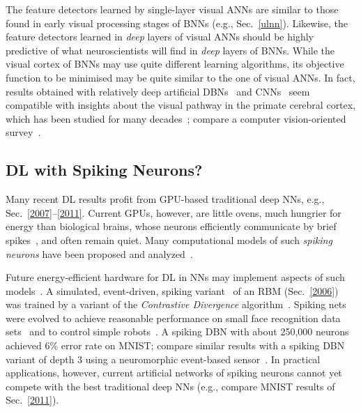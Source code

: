 \documentclass[letterpaper]{article}
\begin{document}
\begin{sloppypar}
The feature detectors learned by single-layer visual ANNs 
are similar to those found in early visual processing stages of BNNs
(e.g., Sec.~\ref{ulnn}).
Likewise, the feature detectors learned in {\em deep} layers of visual ANNs should be highly predictive of what neuroscientists will find in {\em deep} layers of BNNs. While the visual cortex of BNNs may use quite different learning algorithms, its objective function to be minimised may be quite similar to the one of visual ANNs. 
In fact, results obtained 
with relatively deep artificial DBNs~\citep{lee2007sparse} and CNNs~\citep{Yamins2013}
seem compatible with insights about
the visual pathway in the primate cerebral cortex,
which has been studied for many decades~\citep[e.g.,][]{hubel1968,perrett1982,desimone1984,felleman1991,perrett1992,Tanaka:94,logothetis1995,Bichot:05,poggio2005,lennie2005,connor2007,kriegeskorte2008,dicarlo2012}; compare a 
computer vision-oriented survey~\citep{kruger2013}.



\subsection{DL with Spiking Neurons?}
\label{spiking}
Many recent DL results profit from GPU-based traditional deep NNs, e.g., Sec.~\ref{2007}--\ref{2011}. Current GPUs, however, are little ovens, much hungrier for energy than biological brains, whose neurons efficiently communicate by brief spikes~\citep{hodgkin1952,fitzhugh1961,nagumo1962}, 
and often remain quiet. Many computational models of such 
{\em spiking neurons} have been proposed and analyzed~\citep[e.g.,][]{gerstner1992,zipser1993,stemmler1996,tsodyks1996,maex1996,maass1996,maass1997,kistler1997,amit1997,tsodyks1998,kempter1999,song2000,stoop2000,brunel2000,bohte2002,gerstnerbook,izhikevich2003,seung2003,deco2005,brette2007,brea2013,nessler2013,kasabov2014,maass2014,rezende2014}.

Future energy-efficient hardware for DL in NNs may implement aspects of such models~\citep[e.g.,][]{liu2001,roggen2003,glackin2005,schemmel2006,fieres2008,khan2008,serrano2009,jin2010,indiveri2011,neil2014,merolla2014}. 
A simulated, event-driven, spiking variant~\citep{nefti2014} of an RBM (Sec.~\ref{2006})
was trained by a variant of the
{\em Contrastive Divergence} algorithm~\citep{hinton:2002}.
Spiking nets were evolved to achieve reasonable performance on small face recognition data sets~\citep{wysoski2010} and to control simple robots~\citep{floreano2001,hagras2004}.
A spiking DBN with about 250,000 neurons~\citep[as part of a larger NN;][]{eliasmith2012,eliasmith2013} 
achieved 6\% error rate on MNIST;
compare similar results with a spiking DBN variant of depth 3 using a neuromorphic event-based sensor~\citep{oconnor2013}. 
In practical applications, however,
current artificial networks of
spiking neurons cannot yet compete with the best traditional deep NNs
(e.g., compare MNIST results of Sec.~\ref{2011}). 


\end{sloppypar}
\end{document}
